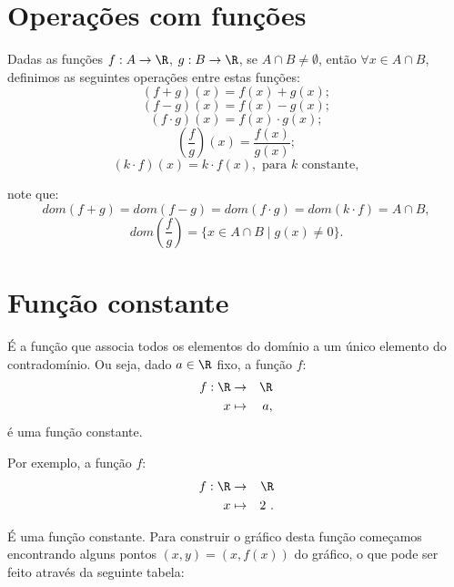 \section{Operações com funções}
Dadas as funções $f: A \rightarrow \R$, $g: B \rightarrow \R$, se $A \cap B \neq \emptyset$, então $\forall x \in A \cap B$, definimos as seguintes operações entre estas funções:
\begin{equation}
(f + g)(x)= f(x) + g(x); 
\end{equation}
\begin{equation}
(f - g)(x)= f(x) - g(x); 
\end{equation}
\begin{equation}
(f \cdot g)(x)= f(x) \cdot g(x); 
\end{equation}
\begin{equation}
 \left( \frac{f}{g} \right) (x)= \frac{f(x)}{g(x)} ;
\end{equation}
\begin{equation}
(k \cdot f)(x)= k \cdot f(x), \text{ para } k \text{ constante} ,
\end{equation}

note que:
\begin{equation}
dom(f+g)= dom(f-g)= dom(f \cdot g)= dom(k \cdot f)= A \cap B ,
\end{equation}
\begin{equation}
 dom\left( \frac{f}{g} \right)= \{x \in A \cap B \mid g(x) \neq 0\}. 
\end{equation}

\section{Função constante}

É a função que associa todos os elementos do domínio a um único elemento do contradomínio. Ou seja, dado $a \in \R$ fixo, a função $f$:
\begin{eqnarray*}
 f: \R & \rightarrow & \R \\
 x & \mapsto & a,
\end{eqnarray*}
é uma função constante.

Por exemplo, a função $f$:
\begin{eqnarray*}
 f: \R & \rightarrow & \R \\
 x & \mapsto & 2 \ .
\end{eqnarray*}

É uma função constante. Para construir o gráfico desta função começamos encontrando alguns pontos $(x, y)= (x, f(x))$ do gráfico, o que pode ser feito através da seguinte tabela:

